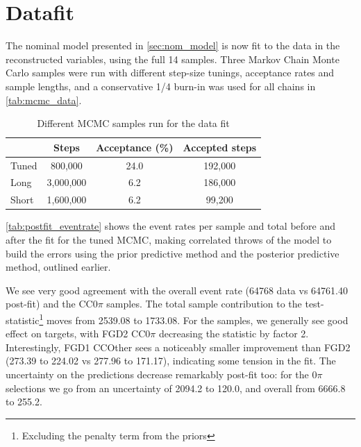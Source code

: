 \section{Datafit}
\label{sec:datafit}
The nominal model presented in \autoref{sec:nom_model} is now fit to the data in the reconstructed \pmu \cosmu variables, using the full 14 samples. Three Markov Chain Monte Carlo samples were run with different step-size tunings, acceptance rates and sample lengths, and a conservative 1/4 burn-in was used for all chains in \autoref{tab:mcmc_data}.
\begin{table}[h]
	\centering
	\begin{tabular}{l | c c c}
		\hline \hline
					& Steps		& Acceptance (\%) & Accepted steps \\
		\hline
		Tuned			& 800,000		& 24.0 	& 192,000 \\
		Long			& 3,000,000		& 6.2 	& 186,000 \\
		Short			& 1,600,000		& 6.2 	& 99,200 \\
		\hline \hline
	\end{tabular}
\caption{Different MCMC samples run for the data fit}
\label{tab:mcmc_data}
\end{table}

\autoref{tab:postfit_eventrate} shows the event rates per sample and total before and after the fit for the tuned MCMC, making correlated throws of the model to build the errors using the prior predictive method and the posterior predictive method, outlined earlier. 

We see very good agreement with the overall event rate (64768 data vs 64761.40 post-fit) and the CC0$\pi$ samples. The total sample contribution to the test-statistic\footnote{Excluding the penalty term from the priors} moves from 2539.08 to 1733.08. For the samples, we generally see good effect on targets, with FGD2 CC0$\pi$ decreasing the statistic by factor 2. Interestingly, FGD1 CCOther sees a noticeably smaller improvement than FGD2 (273.39 to 224.02 vs 277.96 to 171.17), indicating some tension in the fit. The uncertainty on the predictions decrease remarkably post-fit too: for the 0$\pi$ selections we go from an uncertainty of 2094.2 to 120.0, and overall from 6666.8 to 255.2. 

